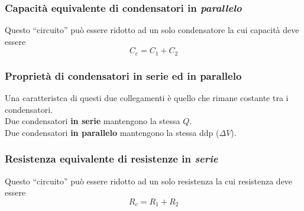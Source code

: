 \subsubsection{Capacità equivalente di condensatori in \emph{parallelo}}
\begin{center}
\end{center}
Questo ``circuito'' può essere ridotto ad un solo condensatore la cui capacità deve essere
\begin{equation*}
  C_e = C_1 + C_2
\end{equation*}

\subsubsection{Proprietà di condensatori in serie ed in parallelo}
Una caratteristca di questi due collegamenti è quello che rimane costante tra i
condensatori.\\[\baselineskip]
Due condensatori \textbf{in serie} mantengono la stessa $Q$.\\
Due condensatori \textbf{in parallelo} mantengono la stessa ddp ($\Delta V$).

\subsubsection{Resistenza equivalente di resistenze in \emph{serie}}
\begin{center}
\end{center}
Questo ``circuito'' può essere ridotto ad un solo resistenza la cui resistenza deve essere
\begin{equation*}
  R_e = R_1 + R_2
\end{equation*}

